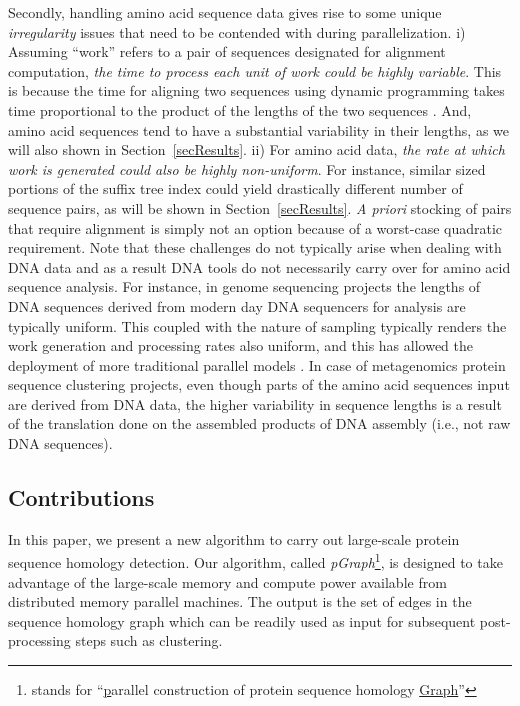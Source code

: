 \documentclass[10pt,journal,letterpaper,compsoc]{IEEEtran}
\begin{document}
Secondly, handling amino acid sequence data gives rise to some unique \emph{irregularity} issues that need to be contended with during parallelization. i) Assuming ``work'' refers to a pair of sequences designated for alignment computation, \emph{the time to process each unit of work could be highly variable}. This is because the time for aligning two sequences using dynamic programming takes time proportional to the product of the lengths of the two sequences \cite{Needleman70,Smith81}. And, amino acid sequences tend to have a substantial variability in their lengths, as we will also shown in Section~\ref{secResults}. 
ii) For amino acid data, \emph{the rate at which work is generated could also be highly non-uniform}. For instance, similar sized portions of the suffix tree index could yield drastically different number of sequence pairs, as will be shown in Section~\ref{secResults}. {\it A priori} stocking of pairs that require alignment is simply not an option because of a worst-case quadratic requirement.
Note that these challenges do not typically arise when dealing with DNA data and as a result DNA tools do not necessarily carry over for amino acid sequence analysis. For instance, in genome sequencing projects the lengths of DNA sequences derived from modern day DNA sequencers for analysis are typically uniform. This coupled with the nature of sampling typically renders the work generation and processing rates also uniform, and this has allowed the deployment of more traditional parallel models \cite{KalyanaramanJPDC07}. In case of metagenomics protein sequence clustering projects, even though parts of the amino acid sequences input are derived from DNA data, the higher variability in sequence lengths is a result of the translation done on the assembled products of DNA assembly (i.e., not raw DNA sequences).

\subsection{Contributions}
\label{secContributions}


In this paper, we present a new algorithm to carry out large-scale protein sequence homology detection. Our algorithm, called {\it pGraph}\footnote{stands for ``\underline{p}arallel construction of protein sequence homology \underline{Graph}''}, is designed to take advantage of the large-scale memory and compute power available from distributed memory parallel machines. The output is the set of edges in the sequence homology graph which can be readily used as input for subsequent post-processing steps such as clustering. 
\end{document}

